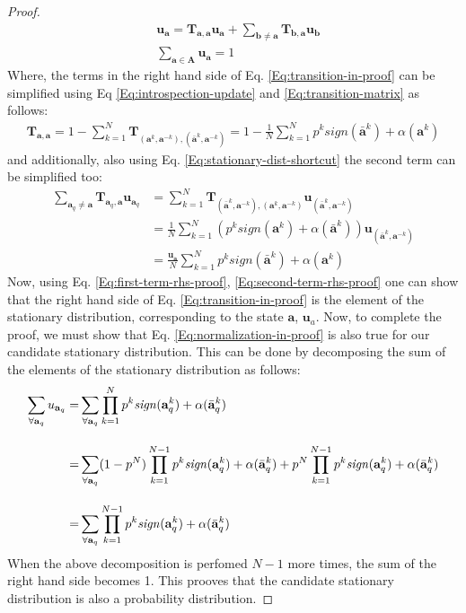 \documentclass[11pt]{article}
\theoremstyle{plainCl1}
\theoremstyle{plainCl2}
\newcommand{\A}{\mathbf{A}}
\newcommand{\abf}{\mathbf{a}}
\newcommand{\bbf}{\mathbf{b}}
\newcommand{\T}{\mathbf{T}}
\newcommand{\ubf}{\mathbf{u}}
\begin{document}
\begin{proof}
\begin{align}
\label{Eq:transition-in-proof}
&\ubf_\abf = \T_{\abf,\abf} \ubf_\abf  + \sum_{\bbf \neq \abf} \T_{\bbf, \abf} \ubf_{\bbf}  \\[10pt] 
\label{Eq:normalization-in-proof}
&\sum_{\abf \in \A} \ubf_{\abf}= 1
\end{align}
Where, the terms in the right hand side of Eq. \ref{Eq:transition-in-proof} can be simplified using Eq \ref{Eq:introspection-update} and \ref{Eq:transition-matrix} as follows:
\begin{eqnarray}
\T_{\abf,\abf} = 1 - \sum_{k=1}^{N} \T_{(\abf^k, \abf^{-k}), (\bar{\abf}^k,\abf^{-k})} = 1 - \frac{1}{N} \sum_{k=1}^{N} p^k \textit{sign}(\bar{\abf}^k) + \alpha(\abf^k)
\label{Eq:first-term-rhs-proof}
\end{eqnarray} 
and additionally, also using Eq. \ref{Eq:stationary-dist-shortcut} the second term can be simplified too:
\begin{align}
\sum_{\abf_q \neq \abf} \T_{\abf_q, \abf} \ubf_{\abf_q} &= \sum_{k = 1}^N \T_{(\bar{\abf}^k,\abf^{-k}), (\abf^k, \abf^{-k})} \ubf_{(\bar{\abf}^k,\abf^{-k})} \\[10pt]
&= \frac{1}{N} \sum_{k = 1}^N \left(p^k \textit{sign}(\abf^k) +\alpha(\bar{\abf}^k) \right) \ubf_{(\bar{\abf}^k,\abf^{-k})} \\[10pt] 
\label{Eq:second-term-rhs-proof}
&= \frac{\ubf_\abf}{N} \sum_{k=1}^{N} p^k \textit{sign}(\bar{\abf}^k) + \alpha(\abf^k) 
\end{align}
Now, using Eq. \ref{Eq:first-term-rhs-proof}, \ref{Eq:second-term-rhs-proof} one can show that the right hand side of Eq. \ref{Eq:transition-in-proof} is the element of the stationary distribution, corresponding to the state $\abf$, $\ubf_a$.  Now, to complete the proof, we must show that Eq. \ref{Eq:normalization-in-proof} is also true for our candidate stationary distribution. This can be done by decomposing the sum of the elements of the stationary distribution as follows:
\begin{align}
\sum_{\forall \abf_q} u_{\abf_q} =& \displaystyle \sum_{\forall \abf_q} \prod_{k=1}^N p^k \mathit{sign}(\abf_q^k) + \alpha(\bar{\abf}_q^k) \\[10pt]
=& \displaystyle \displaystyle \sum_{\forall \abf_q} (1-p^N)  \prod_{k=1}^{N-1} p^k \mathit{sign}(\abf_q^k) + \alpha(\bar{\abf}_q^k)  + p^N  \prod_{k=1}^{N-1} p^k \mathit{sign}(\abf_q^k) + \alpha(\bar{\abf}_q^k) \\[10pt]
=& \displaystyle \sum_{\forall \abf_q} \prod_{k=1}^{N-1} p^k \mathit{sign}(\abf_q^k) + \alpha(\bar{\abf}_q^k)
\end{align}
When the above decomposition is perfomed $N-1$ more times, the sum of the right hand side becomes 1. This prooves that the candidate stationary distribution is also a probability distribution.
\end{proof}
\end{document}
